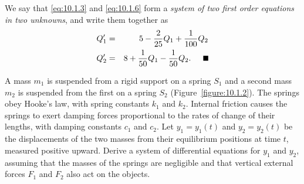 \begin{examplesolution}
We say that \eqref{eq:10.1.3} and \eqref{eq:10.1.6} form a {\color{blue}\it system of two first
order equations in two unknowns\/}, and write them together as
\begin{eqnarray*}
  Q_{1}' & = & \dst{5-\frac{2}{25}Q_{1}+\frac{1}{100}Q_{2}} \\
  Q_{2}' & = & \dst{8+\frac{1}{50}Q_{1}-\frac{1}{50}Q_{2}}.\quad\bbox
\end{eqnarray*}
\end{examplesolution}

\begin{example}
  \label{example:10.1.2} \rm A mass $m_{1}$ is suspended from a rigid support on a spring $S_{1}$
  and a second mass $m_{2}$ is suspended from the first on a spring $S_{2}$
  (Figure~\ref{figure:10.1.2}). The springs obey Hooke's law, with spring constants $k_{1}$ and
  $k_{2}$. Internal friction causes the springs to exert damping forces proportional to the rates of
  change of their lengths, with damping constants $c_{1}$ and $c_{2}$. Let $y_{1}=y_{1}(t)$ and
  $y_{2}=y_{2}(t)$ be the displacements of the two masses from their equilibrium positions at time
  $t$, measured positive upward. Derive a system of differential equations for $y_{1}$ and $y_{2}$,
  assuming that the masses of the springs are negligible and that vertical external forces $F_{1}$
  and $F_{2}$ also act on the objects.
\end{example}

